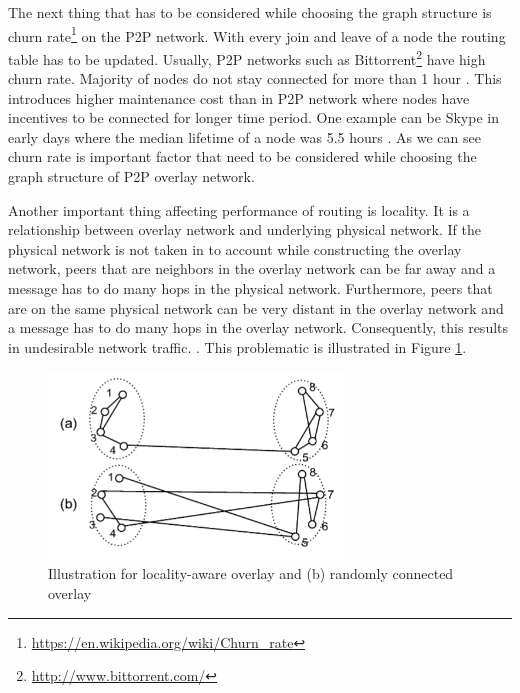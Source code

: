 \quad The next thing that has to be considered while choosing the graph structure is churn rate\footnote{\url{https://en.wikipedia.org/wiki/Churn_rate}} on the P2P network. With every join and leave of a node the routing table has to be updated. Usually, P2P networks such as Bittorrent\footnote{\url{http://www.bittorrent.com/}} have high churn rate. Majority of nodes do not stay connected for more than 1 hour \cite{stutzbach_understanding_2006}. This introduces higher maintenance cost than in P2P network where nodes have incentives to be connected for longer time period. One example can be Skype in early days where the median lifetime of a node was 5.5 hours \cite{guha_experimental_2005}. As we can see churn rate is important factor that need to be considered while choosing the graph structure of P2P overlay network.

Another important thing affecting performance of routing is locality. It is a relationship between overlay network and underlying physical network. If the physical network is not taken in to account while constructing the overlay network, peers that are neighbors in the overlay network can be far away and a message has to do many hops in the physical network. Furthermore, peers that are on the same physical network can be very distant in the overlay network and a message has to do many hops in the overlay network. Consequently, this results in undesirable network traffic. \cite{zhang_construction_2004}. This problematic is illustrated in Figure \ref{fig:localy-aware-overlay}.

\begin{figure}[ht]
	\centering
	\includegraphics[width=0.7\textwidth]{images/localy-aware-overlay-net.png}
	\caption{\label{fig:localy-aware-overlay}Illustration for locality-aware overlay and (b) randomly connected overlay \cite{zhang_construction_2004}}
\end{figure}


